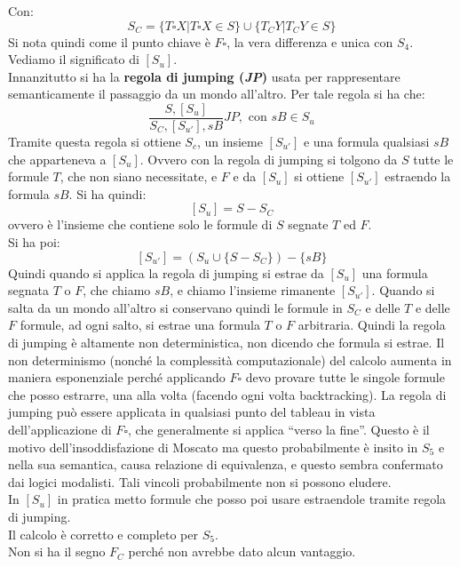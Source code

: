 \documentclass[a4paper,12pt, oneside]{book}
\begin{document}
Con:
\[S_C=\{T\square X|T\square X\in S\}\cup\{T_CY|T_CY\in S\}\]
Si nota quindi come il punto chiave è $F\square$, la vera differenza e unica con
$S_4$. Vediamo il significato di $[S_u]$.\\
Innanzitutto si ha la \textbf{regola di jumping (\textit{JP})} usata per
rappresentare semanticamente il passaggio da un mondo all'altro. Per tale regola
si ha che:
\[\frac{S,[S_u]}{S_C,[S_{u'}],sB}JP,\mbox{ con }sB\in S_u\]
Tramite questa regola si ottiene $S_c$, un insieme $[S_{u'}]$ e una formula
qualsiasi $sB$ che apparteneva a $[S_u]$. Ovvero con la regola di jumping si
tolgono da $S$ tutte le formule $T$, che non siano necessitate, e $F$ e da
$[S_u]$ si ottiene $[S_{u'}]$ estraendo la formula $sB$. Si ha quindi:
\[[S_u]=S-S_C\]
ovvero è l'insieme che contiene solo le formule di $S$ segnate $T$ ed $F$.\\
Si ha poi:
\[[S_{u'}]=(S_u\cup\{S-S_C\})-\{sB\}\]
Quindi quando si applica la regola di jumping si estrae da $[S_u]$ una formula
segnata $T$ o $F$, che chiamo $sB$, e chiamo l'insieme rimanente
$[S_{u'}]$. Quando si salta da un mondo all'altro si conservano quindi le
formule in $S_C$ e delle $T$ e delle $F$ formule, ad ogni salto, si estrae una
formula $T$ o $F$ arbitraria. Quindi la regola di jumping è altamente non
deterministica, non dicendo che formula si estrae. Il non determinismo (nonché
la complessità computazionale) del calcolo aumenta in maniera esponenziale
perché applicando $F\square$ devo provare tutte le singole formule che posso
estrarre, una alla volta (facendo ogni volta backtracking). La regola di jumping
può essere applicata in qualsiasi punto del tableau in vista dell'applicazione
di $F\square$, che generalmente si applica ``verso la fine''. Questo è il motivo
dell'insoddisfazione di Moscato ma questo probabilmente è insito in $S_5$ e
nella sua semantica, causa relazione di equivalenza, e questo sembra confermato
dai logici modalisti. Tali vincoli probabilmente non si possono eludere. \\
In $[S_u]$ in pratica metto formule che posso poi usare estraendole tramite
regola di jumping.\\
Il calcolo è corretto e completo per $S_5$.\\
Non si ha il segno $F_C$ perché non avrebbe dato alcun vantaggio.
\end{document}
